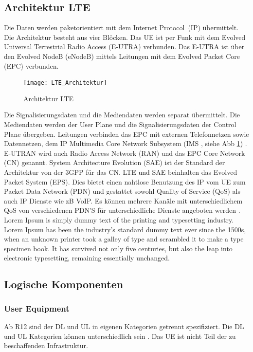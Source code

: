 \subsection{Architektur LTE}
\label{subsec:architektur}
Die Daten werden paketorientiert mit dem Internet Protocol~(IP) übermittelt. Die Architektur besteht aus vier Blöcken. Das UE ist per Funk mit dem Evolved Universal Terrestrial Radio Access (E-UTRA) verbunden. Das E-UTRA ist über den Evolved NodeB (eNodeB) mittels Leitungen mit dem Evolved Packet Core (EPC) verbunden.
\begin{figure}[H]
	\centering
	\texttt{[image: LTE\_Architektur]}
	\caption{Architektur LTE \protect\cite{Fir19}}
	\label{fig:bildarchitektur}
\end{figure}
Die Signalisierungsdaten und die Mediendaten werden separat übermittelt. Die Mediendaten werden der User Plane und die Signalisierungsdaten der Control Plane übergeben. Leitungen verbinden das EPC mit externen Telefonnetzen sowie Datennetzen, dem IP Multimedia Core Network Subsystem (IMS , siehe Abb \ref{fig:bildarchitektur}) \cite{Fir19}.
E-UTRAN wird auch Radio Access Network (RAN) und das EPC Core Network (CN) genannt. System Architecture Evolution (SAE) ist der Standard der Architektur von der 3GPP für das CN. LTE und SAE beinhalten das Evolved Packet System (EPS). Dies bietet einen nahtlose Benutzung des IP vom UE zum Packet Data Network (PDN) und gestattet sowohl Quality of Service (QoS) als auch IP Dienste wie zB VoIP. Es können mehrere Kanäle mit unterschiedlichem QoS von verschiedenen PDN'S für unterschiedliche Dienste angeboten werden \cite{Ses11}.
Lorem Ipsum is simply dummy text of the printing and typesetting industry. Lorem Ipsum has been the industry's standard dummy text ever since the 1500s, when an unknown printer took a galley of type and scrambled it to make a type specimen book. It has survived not only five centuries, but also the leap into electronic typesetting, remaining essentially unchanged.
\subsection{Logische Komponenten}
\label{subsec:logkomponenten}
\subsubsection{User Equipment}
\label{subsubsec:ue}
Ab R12 sind der DL und UL in eigenen Kategorien getrennt spezifiziert. Die DL und UL Kategorien können unterschiedlich sein \cite{GPP19}. Das UE ist nicht Teil der zu beschaffenden Infrastruktur. 
